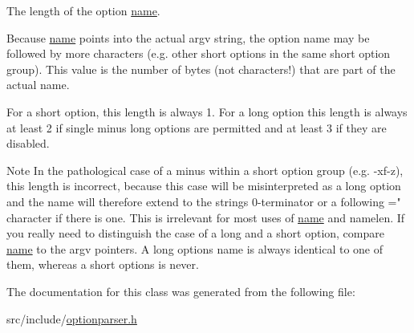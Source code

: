 The length of the option \hyperlink{classxmem_1_1config_1_1third__party_1_1_option_aa73b73027c0a9140aeec654f3fe9aef6}{name}. 

Because \hyperlink{classxmem_1_1config_1_1third__party_1_1_option_aa73b73027c0a9140aeec654f3fe9aef6}{name} points into the actual {\ttfamily argv} string, the option name may be followed by more characters (e.\+g. other short options in the same short option group). This value is the number of bytes (not characters!) that are part of the actual name.

For a short option, this length is always 1. For a long option this length is always at least 2 if single minus long options are permitted and at least 3 if they are disabled.

\begin{DoxyNote}{Note}
In the pathological case of a minus within a short option group (e.\+g. {\ttfamily -\/xf-\/z}), this length is incorrect, because this case will be misinterpreted as a long option and the name will therefore extend to the string\textquotesingle{}s 0-\/terminator or a following \textquotesingle{}=" character if there is one. This is irrelevant for most uses of \hyperlink{classxmem_1_1config_1_1third__party_1_1_option_aa73b73027c0a9140aeec654f3fe9aef6}{name} and {\ttfamily namelen}. If you really need to distinguish the case of a long and a short option, compare \hyperlink{classxmem_1_1config_1_1third__party_1_1_option_aa73b73027c0a9140aeec654f3fe9aef6}{name} to the {\ttfamily argv} pointers. A long option\textquotesingle{}s {\ttfamily name} is always identical to one of them, whereas a short option\textquotesingle{}s is never. 
\end{DoxyNote}


The documentation for this class was generated from the following file\+:\begin{DoxyCompactItemize}
\item 
src/include/\hyperlink{optionparser_8h}{optionparser.\+h}\end{DoxyCompactItemize}
